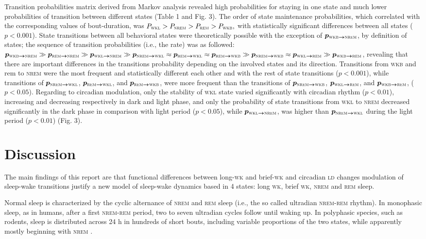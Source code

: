 \documentclass[10pt,letterpaper]{article}
\def\REM/{\textsc{rem}}
\def\NREM/{\textsc{nrem}}
\def\WK/{\textsc{wk}}
\def\WKL/{\textsc{wkl}}
\def\WKB/{\textsc{wkb}}
\def\LD/{\textsc{ld}}
\newcommand{\pp}[2]{\bm{p_{#1 \rightarrow #2}}}
\begin{document}
 
Transition probabilities matrix derived from Markov analysis revealed high probabilities for staying in one state and much lower probabilities of transition between different states (Table 1 and Fig. 3). The order of state maintenance probabilities, which correlated with the corresponding values of bout-duration, was $P_{\WKL/}>P_{\NREM/}>P_{\REM/}>P_{\WKB/},$ with statistically significant differences between all states ($p < 0.001$). State transitions between all behavioral states were theoretically possible with the exception of $ \pp{\WKB/ }{\NREM/} $, by definition of states; the sequence of transition probabilities (i.e., the rate) was as followed: $ \pp{\WKB/ }{\NREM/} \gg \pp{\REM/}{\NREM/} \gg \pp{\WKL/}{ \NREM/} \gg \pp{\NREM/}{\WKL/} \approx \pp{\REM/}{\WKL/} \approx \pp{\REM/}{ \WKB/} \gg \pp{\NREM/}{\WKB/} \approx \pp{\WKL/}{\REM/} \gg \pp{\WKB/}{\REM/} $, revealing that there are important differences in the transitions probability depending on the involved states and its direction. Transitions from \WKB/ and rem to \NREM/ were the most frequent and statistically different each other and with the rest of state transitions ($p < 0.001$), while transitions of $ \pp{\NREM/ }{\WKL/} $, $ \pp{\REM/ }{\WKL/} $, and $ \pp{\REM/ }{\WKB/} $, were more frequent than the transitions of $ \pp{\NREM/ }{\WKB/} $, $ \pp{\WKL/ }{\REM/} $, and $ \pp{\WKB/}{\REM/} $, ($p < 0.05$). Regarding to circadian modulation, only the stability of \WKL/ state varied significantly with circadian rhythm ($p < 0.01$), increasing and decreasing respectively in dark and light phase, and only the probability of state transitions from \WKL/ to \NREM/ decreased significantly in the dark phase in comparison with light period ($p < 0.05$), while $ \pp{\WKL/}{\NREM/} $, was higher than $ \pp{\NREM/ }{\WKL/} $ during the light period ($p < 0.01$) (Fig. 3).


\section{Discussion}

The main findings of this report are that functional differences between long-\WK/ and brief-\WK/ and circadian \LD/ changes modulation of sleep-wake transitions justify a new model of sleep-wake dynamics based in 4 states: long \WK/, brief \WK/, \NREM/ and \REM/ sleep. 

Normal sleep is characterized by the cyclic alternance of \NREM/ and \REM/ sleep (i.e., the so called ultradian \NREM/-\REM/ rhythm). In monophasic sleep, as in humans,  after a first  \NREM/-\REM/ period, two to seven ultradian cycles follow until waking up.  In polyphasic species, such as rodents,  sleep is distributed across 24 h in hundreds of short bouts, including variable proportions of the two states, while apparently mostly beginning with \NREM/ \cite{Saper2010}. 
\end{document}
